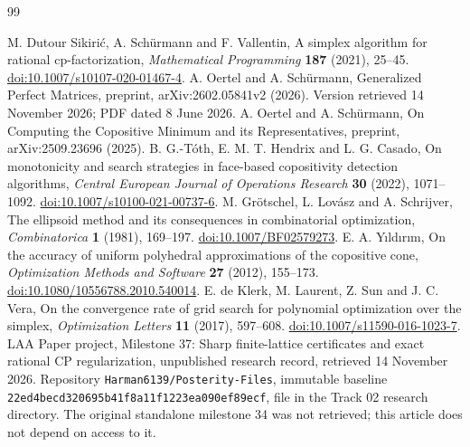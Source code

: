 \documentclass[11pt]{article}
\theoremstyle{remark}\newtheorem{remark}[theorem]{Remark}
\begin{document}
\begin{thebibliography}{99}\raggedright
{} M. Dutour Sikiri\'c, A. Sch\"urmann and F. Vallentin, A simplex algorithm for rational cp-factorization, \emph{Mathematical Programming} \textbf{187} (2021), 25--45. \href{https://doi.org/10.1007/s10107-020-01467-4}{doi:10.1007/s10107-020-01467-4}.
 A. Oertel and A. Sch\"urmann, Generalized Perfect Matrices, preprint, arXiv:2602.05841v2 (2026). Version retrieved 14 November 2026; PDF dated 8 June 2026.
 A. Oertel and A. Sch\"urmann, On Computing the Copositive Minimum and its Representatives, preprint, arXiv:2509.23696 (2025).
 B. G.-T\'oth, E. M. T. Hendrix and L. G. Casado, On monotonicity and search strategies in face-based copositivity detection algorithms, \emph{Central European Journal of Operations Research} \textbf{30} (2022), 1071--1092. \href{https://doi.org/10.1007/s10100-021-00737-6}{doi:10.1007/s10100-021-00737-6}.
 M. Gr\"otschel, L. Lov\'asz and A. Schrijver, The ellipsoid method and its consequences in combinatorial optimization, \emph{Combinatorica} \textbf{1} (1981), 169--197. \href{https://doi.org/10.1007/BF02579273}{doi:10.1007/BF02579273}.
 E. A. Y\i ld\i r\i m, On the accuracy of uniform polyhedral approximations of the copositive cone, \emph{Optimization Methods and Software} \textbf{27} (2012), 155--173. \href{https://doi.org/10.1080/10556788.2010.540014}{doi:10.1080/10556788.2010.540014}.
 E. de Klerk, M. Laurent, Z. Sun and J. C. Vera, On the convergence rate of grid search for polynomial optimization over the simplex, \emph{Optimization Letters} \textbf{11} (2017), 597--608. \href{https://doi.org/10.1007/s11590-016-1023-7}{doi:10.1007/s11590-016-1023-7}.
 LAA Paper project, Milestone 37: Sharp finite-lattice certificates and exact rational CP regularization, unpublished research record, retrieved 14 November 2026. Repository \texttt{Harman6139/Posterity-Files}, immutable baseline \texttt{22ed4becd320695b41f8a11f1223ea090ef89ecf}, file  in the Track 02 research directory. The original standalone milestone 34 was not retrieved; this article does not depend on access to it.
\end{thebibliography}
\end{document}
